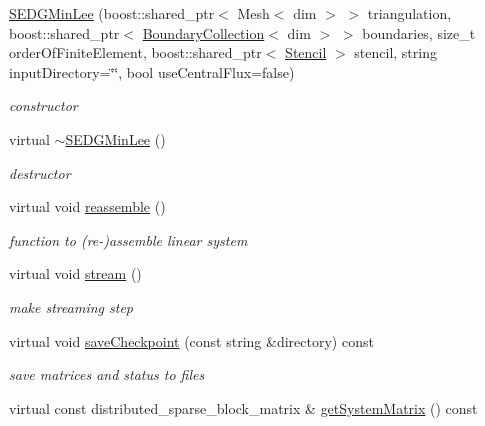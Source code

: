 \begin{DoxyCompactItemize}
\item 
\hyperlink{classnatrium_1_1SEDGMinLee_a429930c197a9ab2a881ffc71aa0dd86b}{SEDGMinLee} (boost::shared\_\-ptr$<$ Mesh$<$ dim $>$ $>$ triangulation, boost::shared\_\-ptr$<$ \hyperlink{classnatrium_1_1BoundaryCollection}{BoundaryCollection}$<$ dim $>$ $>$ boundaries, size\_\-t orderOfFiniteElement, boost::shared\_\-ptr$<$ \hyperlink{classnatrium_1_1Stencil}{Stencil} $>$ stencil, string inputDirectory=\char`\"{}\char`\"{}, bool useCentralFlux=false)
\begin{DoxyCompactList}\small\item\em constructor \item\end{DoxyCompactList}\item 
\hypertarget{classnatrium_1_1SEDGMinLee_a6c55a31bc4cb0e314876af7251ad8ce3}{
virtual \hyperlink{classnatrium_1_1SEDGMinLee_a6c55a31bc4cb0e314876af7251ad8ce3}{$\sim$SEDGMinLee} ()}
\label{classnatrium_1_1SEDGMinLee_a6c55a31bc4cb0e314876af7251ad8ce3}

\begin{DoxyCompactList}\small\item\em destructor \item\end{DoxyCompactList}\item 
virtual void \hyperlink{classnatrium_1_1SEDGMinLee_a5fa8b34df3c3bdd9f492a1e555effbe4}{reassemble} ()
\begin{DoxyCompactList}\small\item\em function to (re-\/)assemble linear system \item\end{DoxyCompactList}\item 
\hypertarget{classnatrium_1_1SEDGMinLee_a04707d696f7f466f17e3de055187ecd9}{
virtual void \hyperlink{classnatrium_1_1SEDGMinLee_a04707d696f7f466f17e3de055187ecd9}{stream} ()}
\label{classnatrium_1_1SEDGMinLee_a04707d696f7f466f17e3de055187ecd9}

\begin{DoxyCompactList}\small\item\em make streaming step \item\end{DoxyCompactList}\item 
virtual void \hyperlink{classnatrium_1_1SEDGMinLee_ab3cf80e18230ee7f08f4ed9883b9dadd}{saveCheckpoint} (const string \&directory) const 
\begin{DoxyCompactList}\small\item\em save matrices and status to files \item\end{DoxyCompactList}\item 
\hypertarget{classnatrium_1_1SEDGMinLee_adcf3f6321cbf27f6c540a6c5f21c7cb0}{
virtual const distributed\_\-sparse\_\-block\_\-matrix \& \hyperlink{classnatrium_1_1SEDGMinLee_adcf3f6321cbf27f6c540a6c5f21c7cb0}{getSystemMatrix} () const }
\label{classnatrium_1_1SEDGMinLee_adcf3f6321cbf27f6c540a6c5f21c7cb0}


\end{DoxyCompactItemize}
